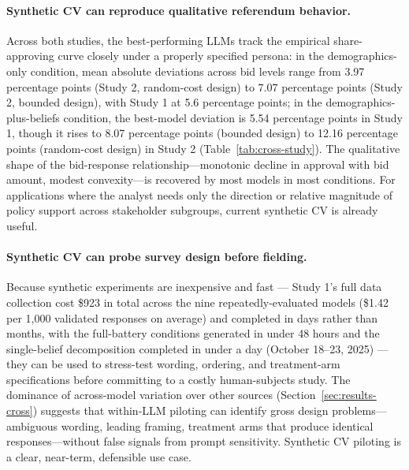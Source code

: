 \documentclass[12pt]{article}
\begin{document}
\paragraph{Synthetic CV can reproduce qualitative referendum behavior.}
Across both studies, the best-performing LLMs track the empirical
share-approving curve closely under a properly specified persona: in the demographics-only condition, mean absolute deviations across bid levels range from 3.97 percentage points (Study 2, random-cost design) to 7.07
percentage points (Study 2, bounded design), with Study 1 at 5.6 percentage points; in the demographics-plus-beliefs condition, the
best-model deviation is 5.54 percentage points in Study 1, though it rises to 8.07 percentage points (bounded design) to 12.16 percentage points (random-cost design) in Study 2 (Table~\ref{tab:cross-study}). The qualitative shape of the bid-response relationship---monotonic decline in approval with bid amount, modest convexity---is recovered by most models
in most conditions. For applications where the analyst needs only the direction or relative magnitude of policy support across stakeholder
subgroups, current synthetic CV is already useful.

\paragraph{Synthetic CV can probe survey design before fielding.} Because
synthetic experiments are inexpensive and fast --- Study 1's full data
collection cost \$923 in total across the nine repeatedly-evaluated models
(\$1.42 per 1{,}000 validated responses on average) and completed in days
rather than months, with the full-battery conditions generated in under 48
hours and the single-belief decomposition completed in under a day
(October 18--23, 2025) --- they can be used to stress-test wording,
ordering, and treatment-arm specifications before committing to a costly
human-subjects study. The dominance of across-model variation over other
sources (Section~\ref{sec:results-cross}) suggests that within-LLM
piloting can identify gross design problems---ambiguous wording, leading
framing, treatment arms that produce identical responses---without false
signals from prompt sensitivity. Synthetic CV piloting is a clear,
near-term, defensible use case.
\end{document}
